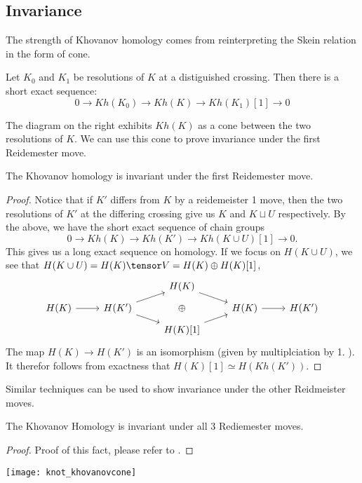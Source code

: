 \begin{doubledpage}
\subsection{Invariance}
The strength of Khovanov homology comes from reinterpreting the Skein relation in the form of cone. 
\begin{theorem}
Let $K_0$ and $K_1$ be resolutions of $K$ at a distiguished crossing.  Then there is a short exact sequence:
\[0\to Kh(K_0)\to Kh(K)\to Kh(K_1)[1]\to 0\]
\end{theorem}
The diagram on the right exhibits $Kh(K)$ as a cone between the two resolutions of $K$. We can use this cone to prove invariance under the first Reidemester move. 

\begin{claim}
The Khovanov homology is invariant under the first Reidemester move. 
\end{claim} 
\begin{proof}
Notice that if $K'$ differs from $K$ by a reidemeister 1 move, then the two resolutions of $K'$ at the differing crossing give us $K$ and $K\sqcup U$ respectively. By the above, we have the short exact sequence of chain groups 
\[0\to Kh(K)\to Kh(K') \to Kh(K\cup U)[1]\to 0.\]
This gives us a long exact sequence on homology. If we focus on $H(K\cup U)$, we see that $H(K\cup U)=H(K)\tensor V= H(K)\oplus H(K)[1]$,\\
\[
\begin{tikzcd}[ row sep=.5em]
\; & & H(K)\arrow{dr}\\
H(K)\arrow{r} &H(K') \arrow{ru} \arrow{dr} & \oplus & H(K) \arrow{r} & H(K')\\
\;& & H(K)[1] \arrow{ur}
\end{tikzcd}
\]
 The map $H(K)\to H(K')$ is an isomorphism (given by multiplciation by 1. ). It therefor follows from exactness  that $H(K)[1]\simeq H(Kh(K'))$. 
 \end{proof}
Similar techniques can be used to show invariance under the other Reidmeister moves. 
\begin{claim}
The Khovanov Homology is invariant under all 3 Rediemester moves. 
\end{claim}
\begin{proof} Proof of this fact, please refer to \cite{bar2002khovanov}.
\end{proof}
\newpage
\begin{vplace}
	\centering
\texttt{[image: knot\_khovanovcone]}
\end{vplace}
\end{doubledpage}